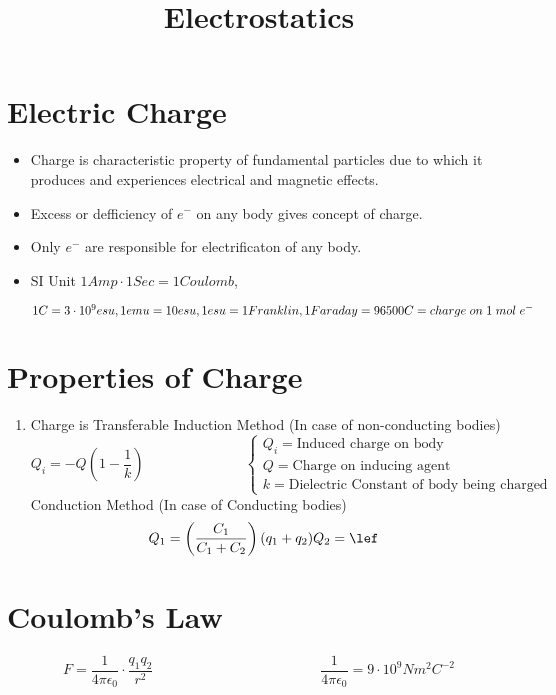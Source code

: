 \documentclass{article}
\title{Electrostatics}
\author{}
\date{}
\begin{document}
\maketitle

\section{Electric Charge}
\begin{itemize}
    \item Charge is characteristic property of fundamental particles due to which it produces and experiences electrical and magnetic effects.
    \item Excess or defficiency of $e^-$ on any body gives concept of charge.
    \item Only $e^-$ are responsible for electrificaton of any body.
    \item SI Unit $1 Amp \cdot 1 Sec=1 Coulomb$,
    
    $1C=3\cdot 10^9 esu, 1emu=10esu, 1esu=1Franklin, 1Faraday=96500C=charge \hspace{1mm} on \hspace{1mm} 1 \hspace{1mm} mol \hspace{1mm} e^-$
\end{itemize}

\section{Properties of Charge}
\begin{enumerate}
    \item Charge is Transferable
    \subitem Induction Method (In case of non-conducting bodies) $$Q_{i}=-Q\left(1-\frac{1}{k}\right) \hspace{3cm} \begin{cases}
        Q_{i}=\text{Induced charge on body} &\\
        Q=\text{Charge on inducing agent} &\\
        k=\text{Dielectric Constant of body being charged}
    \end{cases}$$
\subitem Conduction Method (In case of Conducting bodies)
$$\begin{align}
    Q_{1}=\left(\dfrac{C_{1}}{C_{1}+C_{2}}\right)(q_{1}+q_{2}) &
    Q_{2}=\lef
\end{align}$$
\end{enumerate}

\section{Coulomb's Law}
$$F=\dfrac{1}{4 \pi \epsilon_{0}}\cdot \dfrac{q_{1}q_{2}}{r^2} \hspace{5cm} \dfrac{1}{4 \pi \epsilon_{0}}=9\cdot 10^9 N m^2 C^{-2}$$ 
\end{document}
